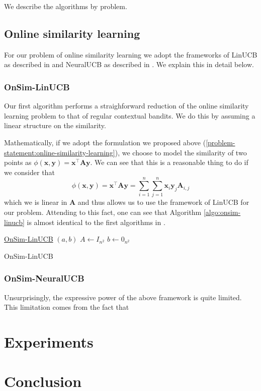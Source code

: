 \documentclass{article}
\begin{document}
We describe the algorithms by problem.

\subsection{Online similarity learning}
For our problem of online similarity learning we adopt the frameworks of  LinUCB  as described in \cite{linucb} and  NeuralUCB as described in \cite{neuralucb}. We explain this in detail below.

\subsubsection{OnSim-LinUCB}
Our first algorithm performs a straighforward reduction of the online similarity learning problem to that of regular contextual bandits. We do this by assuming a linear structure on the similarity.

Mathematically, if we adopt the formulation we proposed above (\ref{problem-statement:online-similarity-learning}), we choose to model the similarity of two points as  $\phi(\mathbf{x}, \mathbf{y}) = \mathbf{x}^\top \mathbf{A} \mathbf{y}$.
We can see that this is a reasonable thing to do if we consider that
\[\phi(\mathbf{x}, \mathbf{y}) = \mathbf{x}^\top \mathbf{A} \mathbf{y} = \sum_{i =1}^n\sum_{j=1}^n \mathbf{x}_i \mathbf{y}_j \mathbf{A}_{i,j} \]
which we is linear in $\mathbf{A}$ and thus allows us to use the framework of LinUCB for our problem.
Attending to this fact, one can see that Algorithm \ref{algo:onsim-linucb} is almost identical to the first algorithms in \cite{linucb}.
\begin{algorithm}
  \label{algo:onsim-linucb}
    \underline{OnSim-LinUCB} $(a,b)$\;
    $A \gets I_{n^2}$\;
    $b \gets 0_{n^2}$\;
    \caption{OnSim-LinUCB}
\end{algorithm}

\subsubsection{OnSim-NeuralUCB}
Unsurprisingly, the expressive power of the above framework is quite limited.
This limitation comes from the fact that


\section{Experiments}

\section{Conclusion}




\end{document}
